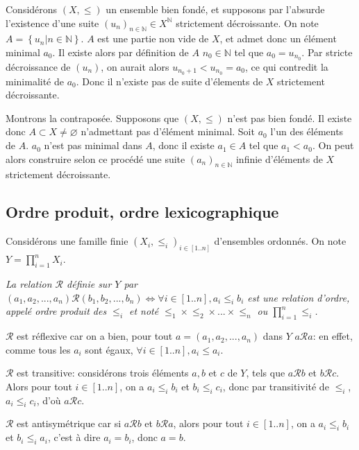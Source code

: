 \documentclass{scrartcl}
\begin{document}
			\begin{demo}
				\item Considérons $(X,\leq)$ un ensemble bien fondé,
				et supposons par l'absurde l'existence d'une suite $(u_n)_{n\in\mathbb{N}}\in X^\mathbb{N}$ strictement décroissante.
				On note $A = \left\{u_n \big| n \in \mathbb{N}\right\}$.
				$A$ est une partie non vide de $X$, et admet donc un élément minimal $a_0$.
				Il existe alors par définition de $A$ $n_0\in\mathbb{N}$ tel que $a_0 = u_{n_0}$.
				Par stricte décroissance de $(u_n)$, on aurait alors  $u_{n_0+1} < u_{n_0} = a_0$, 
				ce qui contredit la minimalité de $a_0$. 
				Donc il n'existe pas de suite d'élements de $X$ strictement décroissante.
				\item Montrons la contraposée. 
				Supposons que $(X,\leq)$ n'est pas bien fondé. 
				Il existe donc $A\subset X \neq \varnothing$ n'admettant pas d'élément minimal.
				Soit $a_0$ l'un des éléments de $A$. 
				$a_0$ n'est pas minimal dans $A$, donc il existe $a_1 \in A$ tel que $a_1 < a_0$.
				On peut alors construire selon ce procédé une suite $(a_n)_{n\in\mathbb{N}}$ infinie
				d'éléments de $X$ strictement décroissante.
			\end{demo}
		\subsection{Ordre produit, ordre lexicographique}
			Considérons une famille finie $(X_i,\leq_i)_{i\in [1..n]}$ d'ensembles ordonnés.
			On note $Y = \prod_{i=1}^n X_i$.
			
			\prop \textsl{La relation $\mathcal{R}$ définie sur $Y$ par 
				$(a_1,a_2,...,a_n)\mathcal{R}(b_1,b_2,...,b_n) \Leftrightarrow \forall i \in [1..n], a_i\leq_i b_i$
				est une relation d'ordre, appelé ordre produit des $\leq_i$ et 
				noté $\leq_1\times\leq_2\times...\times\leq_n$ ou $\prod_{i=1}^n\leq_i$.}
			\begin{demo}
				\item $\mathcal{R}$ est réflexive car on a bien, pour tout $a = (a_1,a_2,...,a_n)$ dans $Y$
					$a\mathcal{R}a$: en effet, comme tous les $a_i$ sont égaux, $\forall i \in [1..n], a_i \leq a_i$.
				\item $\mathcal{R}$ est transitive: considérons trois éléments $a,b$ et $c$ de $Y$,
					tels que $a\mathcal{R}b$ et $b\mathcal{R}c$. Alors pour tout $i \in [1..n]$, on a $a_i\leq_i b_i$
					et $b_i \leq_i c_i$, donc par transitivité de $\leq_i$, $a_i\leq_i c_i$, d'où $a\mathcal{R}c$.
				\item $\mathcal{R}$ est antisymétrique car si $a\mathcal{R}b$ et $b\mathcal{R}a$,
					alors pour tout $i\in [1..n]$, on a $a_i \leq_i b_i$ et $b_i\leq_i a_i$, c'est à dire
					$a_i = b_i$, donc $a=b$.
			\end{demo}
\end{document}
